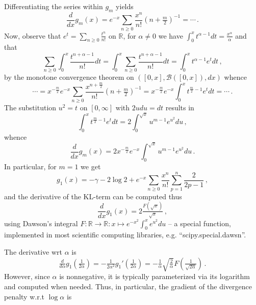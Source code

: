 \documentclass[a4paper,10pt]{article}
\begin{document}
Differentiating the series within $g_m$ yields
$$
\frac{d}{d x} g_m(x)
  = e^{-x} \sum_{n\geq 0} \frac{x^n}{n!} (n + \tfrac{m}2)^{-1}
  = \cdots
  \,. $$
Now, observe that $
    e^t  = \sum_{n\geq 0} \tfrac{t^n}{n!}
$ on $\mathbb{R}$, for $\alpha\neq 0$ we have $
  \int_0^x t^{\alpha-1} dt
    = \tfrac{x^\alpha}{\alpha}
$ and that
$$
\sum_{n\geq 0} \int_0^x \frac{t^{n+\alpha-1}}{n!} dt
  = \int_0^x \sum_{n\geq 0} \frac{t^{n+\alpha-1}}{n!} dt
  = \int_0^x t^{\alpha-1} e^t dt
  \,, $$
by the monotone convergence theorem on $
  ([0, x], \mathcal{B}([0, x]), dx)
$ whence
$$
\cdots
  = x^{-\tfrac{m}2} e^{-x} \sum_{n\geq 0}
      \frac{x^{n + \tfrac{m}2}}{n!} (n + \tfrac{m}2)^{-1}
  = x^{-\tfrac{m}2} e^{-x}
      \int_0^x t^{\tfrac{m}2 - 1} e^t dt
  = \cdots
  \,. $$
The substitution $u^2 = t$ on $[0, \infty]$ with $2u du = dt$ results in
$$
\int_0^x t^{\tfrac{m}2 - 1} e^t  dt
  = 2 \int_0^{\sqrt{x}} u^{m - 1} e^{u^2} du
  \,, $$
whence
$$
\frac{d}{d x} g_m(x)
  = 2 x^{-\tfrac{m}2} e^{-x}
      \int_0^{\sqrt{x}} u^{m - 1} e^{u^2} du
  \,. $$
In particular, for $m=1$ we get
$$
g_1(x)
  = - \gamma - 2 \log{2}
  + e^{-x} \sum_{n\geq 0} \frac{x^n}{n!} \sum_{p=1}^n \frac2{2p - 1}
  \,, $$
and the derivative of the KL-term can be computed thus 
$$
\frac{d}{d x} g_1(x)
  = 2 \tfrac{F(\sqrt{x})}{\sqrt{x}}
  \,, $$
using Dawson's integral $
  F \colon \mathbb{R} \to \mathbb{R}
  \colon x \mapsto e^{-x^2} \int_0^x e^{u^2} du
$ -- a special function, implemented in most scientific computing libraries, e.g.
``scipy.special.dawsn''.

The derivative wrt $\alpha$ is 
$$
\tfrac{d}{d \alpha} g_1(\tfrac1{2\alpha})
  = -\tfrac1{2 \alpha^2} g_1'(\tfrac1{2\alpha})
  = -\tfrac1{\alpha} \sqrt{\tfrac2{\alpha}} F(\tfrac1{\sqrt{2\alpha}})
  \,. $$
However, since $\alpha$ is nonnegative, it is typically parameterized via its logarithm
and computed when needed. Thus, in particular, the gradient of the divergence penalty w.r.t
$\log \alpha$ is
\end{document}
